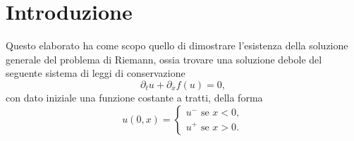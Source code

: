 \chapter*{Introduzione}

Questo elaborato ha come scopo quello di dimostrare l'esistenza della soluzione generale del problema di Riemann, ossia trovare una soluzione debole del seguente sistema di leggi di conservazione
\begin{equation*}
    \partial_{t}u+\partial_{x}f(u)=0,
\end{equation*}
con dato iniziale una funzione costante a tratti, della forma
\begin{equation*}
    u(0,x)=
    \begin{cases}
        u^{-}\text{ se }x<0,\\
        u^{+}\text{ se }x>0.
    \end{cases}
\end{equation*}

